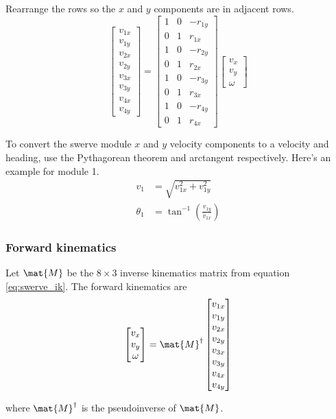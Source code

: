 Rearrange the rows so the $x$ and $y$ components are in adjacent rows.
\begin{equation}
  \label{eq:swerve_ik}
  \begin{bmatrix}
    v_{1x} \\
    v_{1y} \\
    v_{2x} \\
    v_{2y} \\
    v_{3x} \\
    v_{3y} \\
    v_{4x} \\
    v_{4y}
  \end{bmatrix} =
  \begin{bmatrix}
    1 & 0 & -r_{1y} \\
    0 & 1 &  r_{1x} \\
    1 & 0 & -r_{2y} \\
    0 & 1 &  r_{2x} \\
    1 & 0 & -r_{3y} \\
    0 & 1 &  r_{3x} \\
    1 & 0 & -r_{4y} \\
    0 & 1 &  r_{4x}
  \end{bmatrix}
  \begin{bmatrix}
    v_x \\
    v_y \\
    \omega
  \end{bmatrix}
\end{equation}

To convert the swerve module $x$ and $y$ velocity components to a velocity and
heading, use the Pythagorean theorem and arctangent respectively. Here's an
example for module 1.
\begin{align}
  v_1 &= \sqrt{v_{1x}^2 + v_{1y}^2} \\
  \theta_1 &= \tan^{-1}\left(\frac{v_{1y}}{v_{1x}}\right)
\end{align}

\subsubsection{Forward kinematics}

Let $\mat{M}$ be the $8 \times 3$ inverse kinematics matrix from equation
\eqref{eq:swerve_ik}. The forward kinematics are
\begin{equation}
  \begin{bmatrix}
    v_x \\
    v_y \\
    \omega
  \end{bmatrix} =
  \mat{M}^\dagger
  \begin{bmatrix}
    v_{1x} \\
    v_{1y} \\
    v_{2x} \\
    v_{2y} \\
    v_{3x} \\
    v_{3y} \\
    v_{4x} \\
    v_{4y}
  \end{bmatrix}
\end{equation}

where $\mat{M}^\dagger$ is the pseudoinverse of $\mat{M}$.

